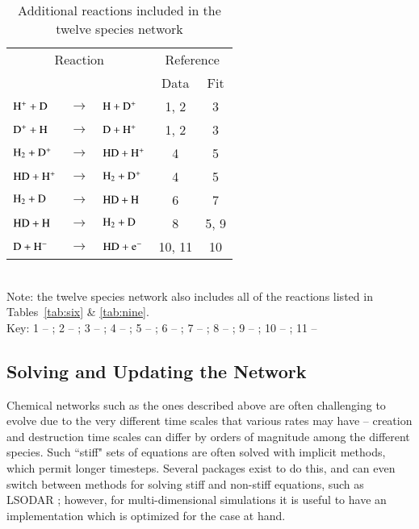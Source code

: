 \begin{table}
\caption{Additional reactions included in the twelve species network \label{tab:12}}
\begin{tabular}{lclcc}
\hline
\multicolumn{3}{c}{Reaction} & \multicolumn{2}{c}{Reference} \\
& & & Data & Fit \\
\hline
${\rm H^{+} + D}$ & $\rightarrow$ & ${\rm H + D^{+}}$ & 1, 2 & 3 \\
${\rm D^{+} + H}$ & $\rightarrow$ & ${\rm D + H^{+}}$ & 1, 2 & 3 \\
${\rm H_{2} + D^{+}}$ & $\rightarrow$ & ${\rm HD + H^{+}}$ & 4 & 5 \\
${\rm HD + H^{+}}$ & $\rightarrow$ & ${\rm H_{2} + D^{+}}$ & 4 & 5 \\
${\rm H_{2} + D}$ & $\rightarrow$ & ${\rm HD + H}$ & 6 & 7 \\
${\rm HD + H}$ & $\rightarrow$ & ${\rm H_{2} + D}$ & 8 & 5, 9 \\
${\rm D + H^{-}}$ & $\rightarrow$ & ${\rm HD + e^{-}}$ & 10, 11 & 10  \\
\hline
\end{tabular}
\\ Note: the twelve species network also includes all of the reactions listed in Tables~\ref{tab:six} \& \ref{tab:nine}.
\\ Key: 1 -- \citet{1999PhRvL..83.4041I}; 2 -- \citet{2000PhRvA..62d2706Z}; 3 -- \citet{2002ApJ...566..599S};
4 -- \citet{1982sasp.nasa..304G}; 5 -- \citet{2002P&SS...50.1197G}; 6 -- \citet{2003PhRvL..91f3201M}; 7 -- \citet{2011ApJ...727..110C}; 
8 -- \citet{1959JChPh..31.1359S}; 9 -- \citet{2007MNRAS.376..709R}; 10 -- \citet{2010Sci...329...69K}; 11 -- \citet{2012PhRvA..86c2714M}
\end{table}


\subsection{Solving and Updating the Network}

Chemical networks such as the ones described above are often challenging to evolve due to the very different time scales that various rates may have -- creation and destruction time scales can differ by orders of magnitude among the different species.   Such ``stiff" sets of equations are often solved with implicit methods, which permit longer timesteps.  Several packages exist to do this, and can even switch between methods for solving stiff and non-stiff equations, such as LSODAR \citep{Hindmarsh83}; however, for multi-dimensional simulations it is useful to have an implementation which is optimized for the case at hand.

